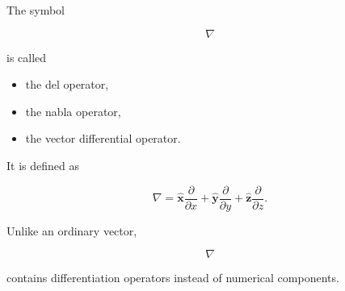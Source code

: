 The symbol

\[
\boxed{
	\nabla
}
\]

is called

\begin{itemize}
	\item the del operator,
	\item the nabla operator,
	\item the vector differential operator.
\end{itemize}

It is defined as

\[
\boxed{
	\nabla
	=
	\hat{\mathbf x}\frac{\partial}{\partial x}
	+
	\hat{\mathbf y}\frac{\partial}{\partial y}
	+
	\hat{\mathbf z}\frac{\partial}{\partial z}.
}
\]

Unlike an ordinary vector,

\[
\nabla
\]

contains differentiation operators instead of numerical components.

